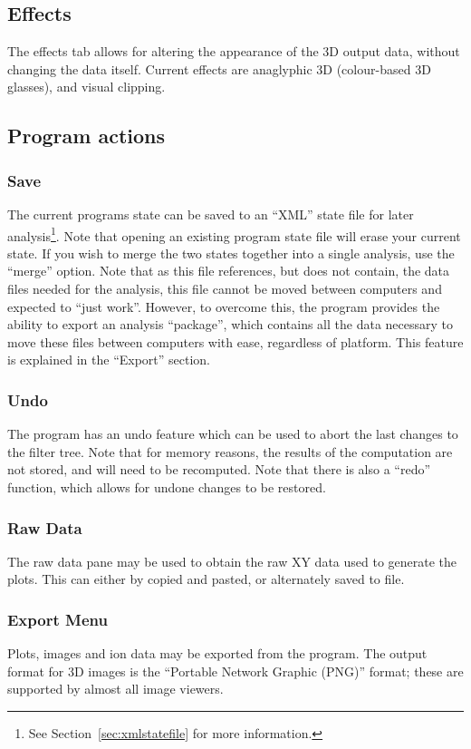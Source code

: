 \documentclass[10pt]{article}
\begin{document}
\subsection{Effects}
The effects tab allows for altering the appearance of the 3D output data, without changing the data itself. Current effects are anaglyphic 3D (colour-based 3D glasses), and visual clipping.  

\subsection{Program actions}

\subsubsection{Save}
The current programs state can be saved to an ``XML'' state file for later analysis\footnote{See Section~\ref{sec:xmlstatefile} for more information.}. Note that opening an existing program state file will erase your current state. If you wish to merge the two states together into a single analysis, use the ``merge'' option. Note that as this file references, but does not contain, the data files needed for the analysis, this file cannot be moved between computers and expected to ``just work''. However, to overcome this, the program provides the ability to export an analysis ``package'', which contains all the data necessary to move these files between computers with ease, regardless of platform. This feature is explained in the ``Export'' section.

\subsubsection{Undo}
The program has an undo feature which can be used to abort the last changes to the filter tree. Note that for memory reasons, the results of the computation are not stored, and will need to be recomputed. Note that there is also a ``redo'' function, which allows for undone changes to be restored. 

\subsubsection{Raw Data}
The raw data pane may be used to obtain the raw XY data used to generate the plots. This can either by copied and pasted, or alternately saved to file.  

\subsubsection{Export Menu}
Plots, images and ion data may be exported from the program. The output format for 3D images is the ``Portable Network Graphic (PNG)'' format; these are supported by almost all image viewers. 
\end{document}

